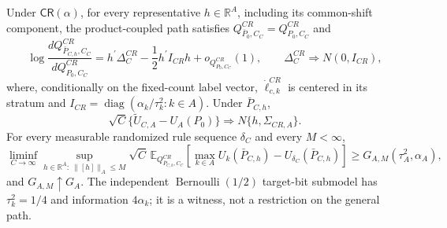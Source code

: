 Under \(\mathsf{CR}(\alpha)\), for every representative \(h\in\mathbb R^A\), including its common-shift component, the product-coupled path satisfies \(Q^{CR}_{\bar P_0,C_C}=Q^{CR}_{P_0,C_C}\) and
\[
\log\frac{dQ^{CR}_{\bar P_{C,h},C_C}}{dQ^{CR}_{P_0,C_C}}
=h^{\prime}\Delta_C^{CR}-\frac12h^{\prime}I_{CR}h+o_{Q^{CR}_{P_0,C_C}}(1),
\qquad \Delta_C^{CR}\Rightarrow N(0,I_{CR}),
\]
where, conditionally on the fixed-count label vector, \(\dot\ell_{c,k}^{CR}\) is centered in its stratum and \(I_{CR}=\operatorname{diag}(\alpha_k/\tau_k^2:k\in A)\).  Under \(\bar P_{C,h}\),
\[
\sqrt C\{\widetilde U_{C,A}-U_A(P_0)\}\Rightarrow N\{h,\Sigma_{CR,A}\}.
\]
For every measurable randomized rule sequence \(\delta_C\) and every \(M<\infty\),
\[
\liminf_{C\to\infty}\sup_{h\in\mathbb R^A:\ \lVert[h]\rVert_A\leq M}
\sqrt C\,\mathbb E_{Q^{CR}_{\bar P_{C,h},C_C}}
\left[\max_{k\in A}U_k(\bar P_{C,h})-U_{\delta_C}(\bar P_{C,h})\right]
\geq G_{A,M}(\tau_A^2,\alpha_A),
\]
and \(G_{A,M}\uparrow G_A\).  The independent \(\operatorname{Bernoulli}(1/2)\) target-bit submodel has \(\tau_k^2=1/4\) and information \(4\alpha_k\); it is a witness, not a restriction on the general path.